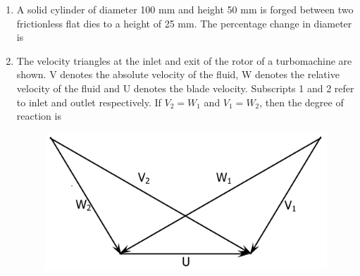 \documentclass[journal,12pt,onecolumn]{IEEEtran}
\begin{document}
\begin{enumerate}
          \begin{enumerate}
          \end{enumerate}

    \item A solid cylinder of diameter 100 mm and height 50 mm is forged between two frictionless flat dies to a height of 25 mm. The percentage change in diameter is

          \begin{enumerate}
          \end{enumerate}

    \item The velocity triangles at the inlet and exit of the rotor of a turbomachine are shown. V denotes the absolute velocity of the fluid, W denotes the relative velocity of the fluid and U denotes the blade velocity. Subscripts 1 and 2 refer to inlet and outlet respectively. If \(V_2 = W_1\) and \(V_1 = W_2\), then the degree of reaction is

          \begin{figure}[H]
              \centering
              \includegraphics[scale=0.2]{q17}
              \caption{}
              \label{q17}
          \end{figure}


\end{enumerate}
\end{document}
